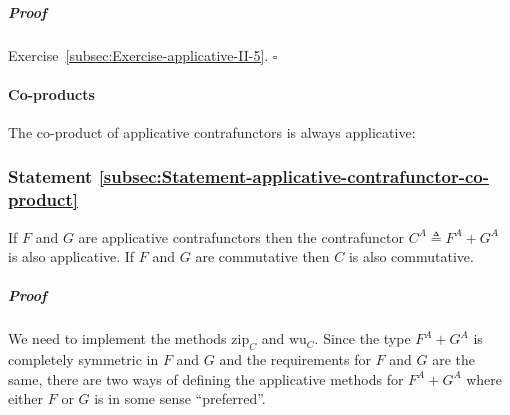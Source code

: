 \subparagraph{Proof}

Exercise~\ref{subsec:Exercise-applicative-II-5}. $\square$

\paragraph{Co-products}

The co-product of applicative contrafunctors is always applicative: 

\subsubsection{Statement \label{subsec:Statement-applicative-contrafunctor-co-product}\ref{subsec:Statement-applicative-contrafunctor-co-product}}

If $F$ and $G$ are applicative contrafunctors then the contrafunctor
$C^{A}\triangleq F^{A}+G^{A}$ is also applicative. If $F$ and $G$
are commutative then $C$ is also commutative.

\subparagraph{Proof}

We need to implement the methods $\text{zip}_{C}$ and $\text{wu}_{C}$.
Since the type $F^{A}+G^{A}$ is completely symmetric in $F$ and
$G$ and the requirements for $F$ and $G$ are the same, there are
two ways of defining the applicative methods for $F^{A}+G^{A}$ where
either $F$ or $G$ is in some sense \textsf{``}preferred\textsf{''}.

